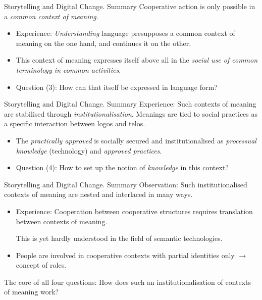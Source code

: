 \documentclass{beamer}
\begin{document}
\begin{frame}{Storytelling and Digital Change. Summary}
Cooperative action is only possible in a \emph{common context of meaning}.
\begin{itemize}
\item Experience: \emph{Understanding} language presupposes a common context
  of meaning on the one hand, and continues it on the other.
\item This context of meaning expresses itself above all in the \emph{social
  use of common terminology in common activities}.
\item Question (3): How can that itself be expressed in language form?
\end{itemize}
\end{frame}
\begin{frame}{Storytelling and Digital Change. Summary}
Experience: Such contexts of meaning are stabilised through
\emph{institutionalisation}. Meanings are tied to social practices as a
specific interaction between logos and telos.
\begin{itemize}
\item The \emph{practically approved} is socially secured and
  institutionalised as \emph{processual knowledge} (technology) and
  \emph{approved practices}.
\item Question (4): How to set up the notion of \emph{knowledge} in this
  context?
\end{itemize}\vspace*{2em}
\end{frame}
\begin{frame}{Storytelling and Digital Change. Summary}
Observation: Such institutionalised contexts of meaning are nested and
interlaced in many ways.
\begin{itemize}
\item Experience: Cooperation between cooperative structures requires
  translation between contexts of meaning.

  This is yet hardly understood in the field of semantic technologies.
\item People are involved in cooperative contexts with partial identities only
  $\to$ concept of roles.
\end{itemize}
The core of all four questions: How does such an institutionalisation of
contexts of meaning work?
\end{frame}
\end{document}
